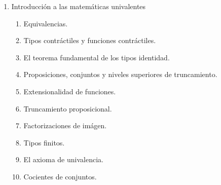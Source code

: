 \documentclass{article}
\begin{document}
\begin{itemize}
\begin{enumerate}
\begin{enumerate}
        \end{enumerate}
        \item Introducción a las matemáticas univalentes
        \begin{enumerate}
            \item Equivalencias.
            \item Tipos contráctiles y funciones contráctiles.
            \item El teorema fundamental de los tipos identidad.
            \item Proposiciones, conjuntos y niveles superiores de truncamiento.
            \item Extensionalidad de funciones.
            \item Truncamiento proposicional.
            \item Factorizaciones de imágen.
            \item Tipos finitos.
            \item El axioma de univalencia.
            \item Cocientes de conjuntos.
        \end{enumerate}
    \end{enumerate}
    
\end{itemize}



\end{document}
